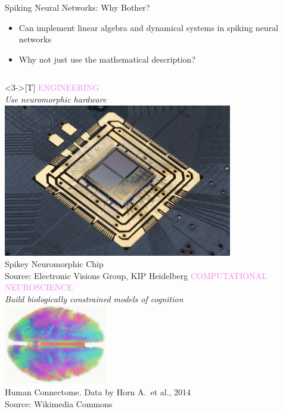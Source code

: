 \documentclass[aspectratio=169]{beamer}
\begin{document}

\begin{frame}{Spiking Neural Networks: Why Bother?}
	\begin{itemize}
		\item<1-> Can implement linear algebra and dynamical systems in spiking neural networks\\
		\item<2->[$\Rightarrow$] Why not just use the mathematical description?
	\end{itemize}
	\vspace{0.25cm}
	\begin{overlayarea}{\textwidth}{0.7\textheight}
		\begin{columns}<3->[T]
			\centering
			\textcolor{violet}{ENGINEERING}\\\emph{Use neuromorphic hardware}\\[0.25cm]
			\includegraphics[width=0.75\textwidth]{media/spikey_chip_small.jpg}\\[0.25cm]
			\footnotesize\textcolor{aluminium4}{Spikey Neuromorphic Chip\\ Source: Electronic Visions Group, KIP Heidelberg}
			\centering
			\textcolor{violet}{COMPUTATIONAL NEUROSCIENCE}\\\emph{Build biologically constrained models of cognition}\\[0.25cm]
			\includegraphics[height=3.5cm]{media/connectome.jpg}\\[0.25cm]	\footnotesize\textcolor{aluminium4}{Human Connectome. Data by Horn A.~et al., 2014\\ Source: Wikimedia Commons}
		\end{columns}
	\end{overlayarea}
\end{frame}
\backupend
\end{document}
